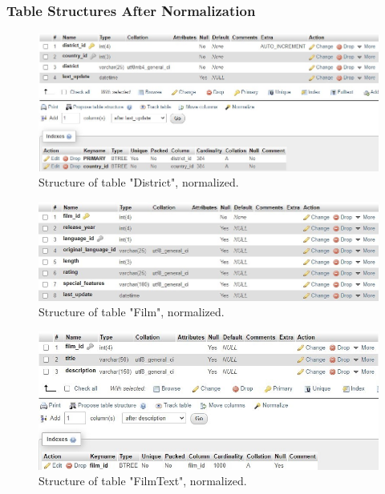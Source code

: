 \documentclass[openany]{article}
\begin{document}
	\subsubsection{Table Structures After Normalization}
		\begin{figure}[H]
			\includegraphics[width=\textwidth]{table_district_nstruct}
			\caption{Structure of table "District", normalized.}
		\end{figure}
		\begin{figure}[H]
			\includegraphics[width=\textwidth]{table_film_nstruct}
			\caption{Structure of table "Film", normalized.}
		\end{figure}
		\begin{figure}[H]
			\includegraphics[width=\textwidth]{table_filmtext_nstruct}
			\caption{Structure of table "Film\textunderscore Text", normalized.}
		\end{figure}
\end{document}
